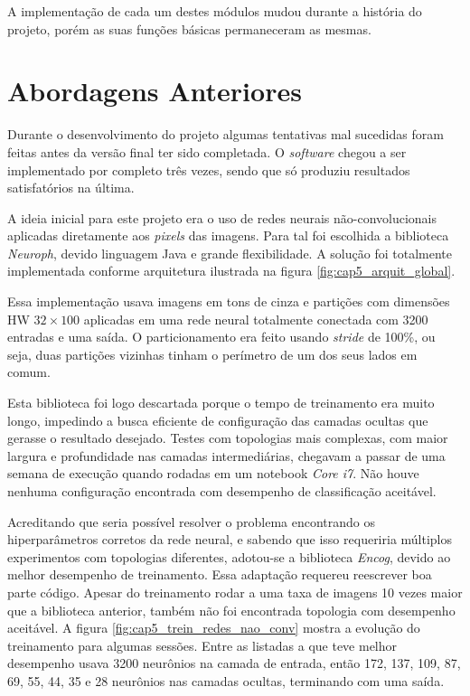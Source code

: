 A implementação de cada um destes módulos mudou durante a história do projeto,
porém as suas funções básicas permaneceram as mesmas.

\section{Abordagens Anteriores} \label{sec:cap5_abord_ant}
Durante o desenvolvimento do projeto algumas tentativas mal sucedidas foram
feitas antes da versão final ter sido completada. O \emph{software} chegou a
ser implementado por completo três vezes, sendo que só produziu resultados
satisfatórios na última.

A ideia inicial para este projeto era o uso de redes neurais não-convolucionais
aplicadas diretamente aos \emph{pixels} das imagens. Para tal foi escolhida a
biblioteca \emph{Neuroph}, devido linguagem Java e grande flexibilidade. A
solução foi totalmente implementada conforme arquitetura ilustrada na figura
\ref{fig:cap5_arquit_global}.

Essa implementação usava imagens em tons de cinza e partições com dimensões HW
$32 \times 100$ aplicadas em uma rede neural totalmente conectada com 3200
entradas e uma saída. O particionamento era feito usando \emph{stride} de
100\%, ou seja, duas partições vizinhas tinham o perímetro de um dos seus
lados em comum.

Esta biblioteca foi logo descartada porque o tempo de treinamento era muito
longo, impedindo a busca eficiente de configuração das camadas ocultas que
gerasse o resultado desejado. Testes com topologias mais complexas, com maior
largura e profundidade nas camadas intermediárias, chegavam a passar de uma
semana de execução quando rodadas em um notebook \emph{Core i7}. Não houve
nenhuma configuração encontrada com desempenho de classificação aceitável.

Acreditando que seria possível resolver o problema encontrando os
hiperparâmetros corretos da rede neural, e sabendo que isso requeriria
múltiplos experimentos com topologias diferentes, adotou-se a biblioteca
\emph{Encog},
devido ao melhor desempenho de treinamento. Essa adaptação requereu reescrever
boa parte código. Apesar do treinamento rodar a uma taxa de imagens 10
vezes maior que a biblioteca anterior, também não foi encontrada topologia
com desempenho aceitável. A figura
\ref{fig:cap5_trein_redes_nao_conv} mostra a
evolução do treinamento para algumas sessões. Entre as listadas a que teve
melhor desempenho usava 3200 neurônios na camada de entrada, então 172, 137,
109, 87, 69, 55, 44, 35 e 28 neurônios nas camadas ocultas, terminando
com uma saída.

